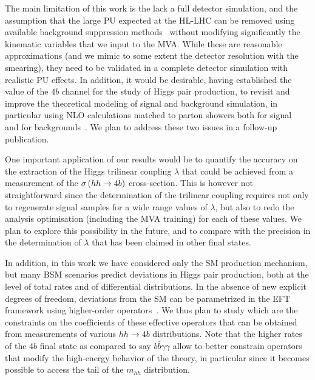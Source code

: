 The main limitation of this work is the lack a full
detector simulation, and the assumption that the large PU
expected at the HL-LHC can be removed using
available background
suppression methods~\cite{Cacciari:2009dp,TheATLAScollaboration:2013pia,Butterworth:2008iy,Cacciari:2007fd,Krohn:2009th,Krohn:2013lba,Ellis:2009me,Bertolini:2014bba,Cacciari:2014gra,Cacciari:2014jta,Berta:2014eza,Larkoski:2014wba} without modifying significantly the
kinematic variables that we input to the MVA.
%
While these are reasonable approximations (and we mimic to some
extent the detector resolution with the smearing), they need
to be validated in a complete detector simulation with realistic
PU effects.
%
In addition, it would be desirable, having established the
value of the $4b$ channel for the study of
Higgs pair production, to revisit and improve the
theoretical modeling of signal and background simulation,
in particular using NLO calculations matched to
parton showers both for signal~\cite{Frederix:2014hta,Maierhofer:2013sha}
and for backgrounds~\cite{Alwall:2014hca,Gleisberg:2008ta}.
%
We plan to address these two issues in a follow-up
publication.

One important application of our results
would be to quantify the accuracy on the extraction of
the Higgs trilinear coupling $\lambda$
that could be achieved from
a measurement of the
$\sigma\left( hh\to 4b\right)$ cross-section.
%
This is however not straightforward since
the determination of the trilinear coupling
requires not only to regenerate signal samples
for a wide range values of  $\lambda$, but also to
redo the analysis
optimisation (including the MVA training) for each
of these values.
%
We plan to explore this possibility in the future, and to
compare with the precision in the determination of
$\lambda$ that has been claimed in other final states.

In addition,
in this work we have considered only the SM production mechanism,
but many BSM scenarios predict deviations
in Higgs pair production, both at the level of total rates
and of
differential distributions.
%
In the absence of new explicit degrees of freedom,
deviations from the SM can be parametrized in
the EFT framework using higher-order
operators~\cite{Azatov:2015oxa,Goertz:2014qta}.
%
We thus plan to study which are the constraints
on the coefficients of these effective
operators that can be obtained from measurements
of various $hh\to 4b$ distributions.
%
Note that the higher rates of the $4b$ final state as compared to
say $b\bar{b}\gamma\gamma$ allow to better constrain operators
that modify the high-energy behavior
of the theory, in particular
since it becomes possible
to access the tail of the $m_{hh}$ distribution.


